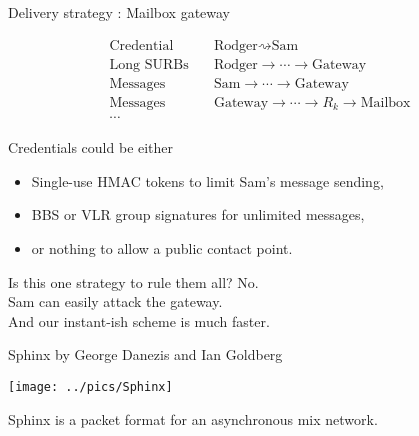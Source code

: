 \documentclass[fleqn,xcolor={usenames,dvipsnames}]{beamer}
\begin{document}
\begin{frame}[t]{Delivery strategy : Mailbox gateway}

\[ \begin{aligned}
\textrm{Credential}\quad & \textrm{Rodger} \rightsquigarrow \textrm{Sam} \\
\textrm{Long SURBs}\quad & \textrm{Rodger} \to \cdots \to \textrm{Gateway} \\
\textrm{Messages}\quad & \textrm{Sam} \to \cdots \to \textrm{Gateway} \\
\textrm{Messages}\quad & \textrm{Gateway} \to \cdots \to R_k \to \textrm{Mailbox} \\
 \cdots
\end{aligned} \]


Credentials could be either 
\begin{itemize}
\item Single-use HMAC tokens to limit Sam's message sending, 
\item BBS or VLR group signatures for unlimited messages,
\item or nothing to allow a public contact point.
\end{itemize}

\bigskip
Is this one strategy to rule them all?  No. \\
 \hspace*{2pt} Sam can easily attack the gateway. \\
 \hspace*{2pt} And our instant-ish scheme is much faster.

\end{frame}


\begin{frame}{Sphinx by George Danezis and Ian Goldberg}

\begin{center}
\texttt{[image: ../pics/Sphinx]}

Sphinx is a packet format for an asynchronous mix network. 

\end{center}
\end{frame}
\end{document}
